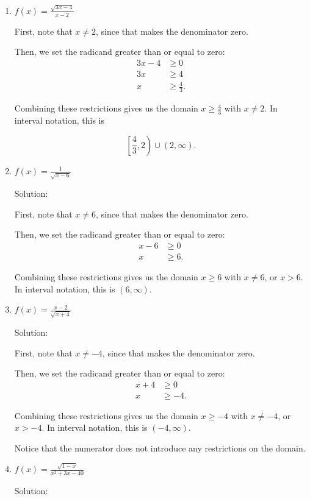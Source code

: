 \documentclass{ximera}
\begin{document}
\begin{enumerate}
	\item $f(x) = \frac{\sqrt{3x - 4}}{x - 2}$
		\begin{expandable}
			\begin{explanation}
First, note that $x \ne 2$, since that makes the denominator zero.

Then, we set the radicand greater than or equal to zero: \begin{align*}3x-4&\ge 0 \\ 3x & \ge 4 \\ x & \ge \frac{4}{3}. \end{align*}

Combining these restrictions gives us the domain $x \ge \frac{4}{3}$ with $x \ne 2$. In interval notation, this is

$$\left[\frac{4}{3}, 2\right) \cup (2, \infty).$$
			\end{explanation}
		\end{expandable}
	\item $f(x) = \frac{1}{\sqrt{x - 6}}$
		\begin{expandable}
			Solution:

First, note that $x \ne 6$, since that makes the denominator zero.

Then, we set the radicand greater than or equal to zero: \begin{align*}x-6&\ge 0 \\ x & \ge 6. \end{align*}

Combining these restrictions gives us the domain $x \ge 6$ with $x \ne 6$, or $x > 6$. In interval notation, this is $(6, \infty)$.
		\end{expandable}
	\item $f(x) = \frac{x - 2}{\sqrt{x + 4}}$
		\begin{expandable}
			Solution:

First, note that $x \ne -4$, since that makes the denominator zero.

Then, we set the radicand greater than or equal to zero: \begin{align*}x + 4&\ge 0 \\ x & \ge -4. \end{align*}

Combining these restrictions gives us the domain $x \ge -4$ with $x \ne -4$, or $x > -4$. In interval notation, this is $(-4, \infty)$.

Notice that the numerator does not introduce any restrictions on the domain. 
		\end{expandable}
	\item $f(x) = \frac{\sqrt{1-x}}{x^2 + 3x - 40}$
		\begin{expandable}
			Solution:


\end{expandable}
\end{enumerate}
\end{document}
